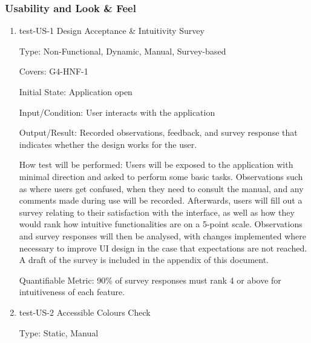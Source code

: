 \documentclass[12pt, titlepage]{article}
\begin{document}


\fi
\subsubsection{Usability and Look \& Feel}

\begin{enumerate}

\item{test-US-1 Design Acceptance \& Intuitivity Survey\\}

Type: Non-Functional, Dynamic, Manual, Survey-based

Covers: G4-HNF-1
					
Initial State: Application open
					
Input/Condition: User interacts with the application
					
Output/Result: Recorded observations, feedback, and survey response that indicates whether the design works for the user.
					
How test will be performed: Users will be exposed to the application with minimal direction and asked to perform 
some basic tasks. Observations such as where users get confused, when they need to consult the manual, and any comments
made during use will be recorded. Afterwards, users will fill out a survey relating to their satisfaction with the interface, 
as well as how they would rank how intuitive functionalities are on a 5-point scale. Observations and survey responses will then be analysed, with
changes implemented where necessary to improve UI design in the case that expectations are not reached. A draft of the survey
is included in the appendix of this document.

Quantifiable Metric: 90\% of survey responses must rank 4 or above for intuitiveness of each feature.

\item{test-US-2 Accessible Colours Check\\}

Type: Static, Manual


\end{enumerate}
\end{document}
